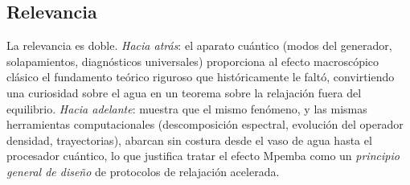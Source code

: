 \subsection{Relevancia}
La relevancia es doble. \emph{Hacia atrás}: el aparato cuántico
(modos del generador, solapamientos, diagnósticos universales) proporciona al
efecto macroscópico clásico el fundamento teórico riguroso que históricamente le
faltó, convirtiendo una curiosidad sobre el agua en un teorema sobre la
relajación fuera del equilibrio. \emph{Hacia adelante}: muestra que el mismo
fenómeno, y las mismas herramientas computacionales (descomposición espectral,
evolución del operador densidad, trayectorias), abarcan sin costura desde el vaso
de agua hasta el procesador cuántico, lo que justifica tratar el efecto Mpemba
como un \emph{principio general de diseño} de protocolos de relajación acelerada.
